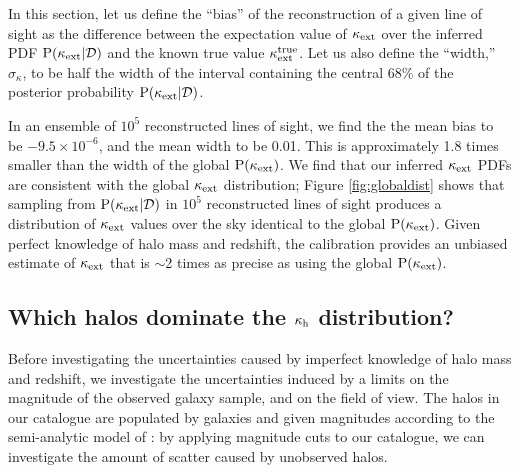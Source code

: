 \documentclass[useAMS,usenatbib]{mn2e}
\begin{document}
In this section, let us define the ``bias'' of the reconstruction of a given
line of sight as the difference between the expectation value of $\kappa_{\rm ext}$ over
the inferred PDF ${\rm P}(\kappa_{\rm ext}|{\mathcal{D}})$ and the known true value $\kappa_{\rm ext}^{\mathrm{true}}$.
Let us also define the ``width,'' $\sigma_{\kappa}$, to be half the width of
the interval containing the central $68\%$ of the posterior probability
${\rm P}(\kappa_{\rm ext}|{\mathcal{D}})$. 

In an ensemble of $10^{5}$ reconstructed lines of sight, we find the the mean
bias to be $-9.5\times 10^{-6}$, and the mean width to be 0.01. This is
approximately 1.8 times smaller than the width of the global ${\rm P}(\kappa_{\rm ext})$. 
We find that our inferred $\kappa_{\rm ext}$ PDFs are consistent with the global
$\kappa_{\rm ext}$ distribution; Figure \ref{fig:globaldist} shows that sampling from
${\rm P}(\kappa_{\rm ext}|{\mathcal{D}})$ in $10^{5}$ reconstructed lines of sight produces a
distribution of $\kappa_{\rm ext}$ values over the sky identical to the global
${\rm P}(\kappa_{\rm ext})$. Given perfect knowledge of halo mass and redshift, the
calibration \proceedure provides an unbiased estimate of $\kappa_{\rm ext}$ that is
$\sim$2 times as precise as using the global ${\rm P}(\kappa_{\rm ext})$.


\subsection{Which halos dominate the $\kappa_{\rm h}$ distribution?}

Before investigating the uncertainties caused by imperfect knowledge of halo
mass and redshift, we investigate the uncertainties induced by a limits on the
magnitude of the observed galaxy sample, and on the field of view. The halos
in our catalogue are populated by galaxies and given magnitudes according to
the semi-analytic model of \citet{DeLucia+Blaizot2007}: by applying magnitude
cuts to our catalogue, we can investigate the amount of scatter caused by
unobserved halos. 
\end{document}
